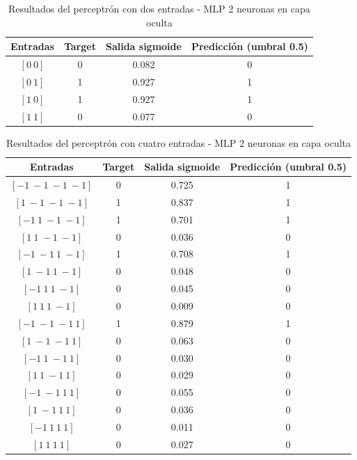 \documentclass[11pt]{article} %
\begin{document}
\begin{table}[h!]
	\centering
	\begin{tabular}{cccc}
		\hline
		\textbf{Entradas} & \textbf{Target} & \textbf{Salida sigmoide} & \textbf{Predicción (umbral 0.5)} \\
		\hline
		$[0\ 0]$ & 0 & 0.082 & 0 \\
		$[0\ 1]$ & 1 & 0.927 & 1 \\
		$[1\ 0]$ & 1 & 0.927 & 1 \\
		$[1\ 1]$ & 0 & 0.077 & 0 \\
		\hline
	\end{tabular}
	\caption{Resultados del perceptrón con dos entradas  - MLP 2 neuronas en capa oculta}
\end{table}

\begin{table}[h!]
	\centering
	\begin{tabular}{cccc}
		\hline
		\textbf{Entradas} & \textbf{Target} & \textbf{Salida sigmoide} & \textbf{Predicción (umbral 0.5)} \\
		\hline
		$[-1\ -1\ -1\ -1]$ & 0 & 0.725 & 1 \\
		$[1\ -1\ -1\ -1]$ & 1 & 0.837 & 1 \\
		$[-1\ 1\ -1\ -1]$ & 1 & 0.701 & 1 \\
		$[1\ 1\ -1\ -1]$ & 0 & 0.036 & 0 \\
		$[-1\ -1\ 1\ -1]$ & 1 & 0.708 & 1 \\
		$[1\ -1\ 1\ -1]$ & 0 & 0.048 & 0 \\
		$[-1\ 1\ 1\ -1]$ & 0 & 0.045 & 0 \\
		$[1\ 1\ 1\ -1]$ & 0 & 0.009 & 0 \\
		$[-1\ -1\ -1\ 1]$ & 1 & 0.879 & 1 \\
		$[1\ -1\ -1\ 1]$ & 0 & 0.063 & 0 \\
		$[-1\ 1\ -1\ 1]$ & 0 & 0.030 & 0 \\
		$[1\ 1\ -1\ 1]$ & 0 & 0.029 & 0 \\
		$[-1\ -1\ 1\ 1]$ & 0 & 0.055 & 0 \\
		$[1\ -1\ 1\ 1]$ & 0 & 0.036 & 0 \\
		$[-1\ 1\ 1\ 1]$ & 0 & 0.011 & 0 \\
		$[1\ 1\ 1\ 1]$ & 0 & 0.027 & 0 \\
		\hline
	\end{tabular}
	\caption{Resultados del perceptrón con cuatro entradas  - MLP 2 neuronas en capa oculta}
\end{table}
\end{document}
